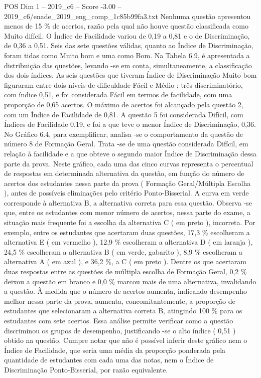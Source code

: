 \begin{textsample}{POS Dim 1 – 2019\_c6 – Score -3.00 – 2019\_c6/enade\_2019\_eng\_comp\_1c85b99fa3.txt}
Nenhuma questão apresentou menos de 15 \% de acertos, razão pela qual não houve questão classificada como Muito difícil.
O Índice de Facilidade variou de 0,19 a 0,81 e o de Discriminação, de 0,36 a 0,51.
Seis das sete questões válidas, quanto ao Índice de Discriminação, foram tidas como Muito bom e uma como Bom.
Na Tabela 6.9, é apresentada a distribuição das questões, levando -se em conta, simultaneamente, a classificação dos dois índices.
As seis questões que tiveram Índice de Discriminação Muito bom figuraram entre dois níveis de dificuldade Fácil e Médio : três discriminatório, com índice 0,51, e foi considerada Fácil em termos de facilidade, com uma proporção de 0,65 acertos.
O máximo de acertos foi alcançado pela questão 2, com um Índice de Facilidade de 0,81.
A questão 5 foi considerada Difícil, com Índices de Facilidade 0,19, e foi a que teve o menor Índice de Discriminação, 0,36.
No Gráfico 6.4, para exemplificar, analisa -se o comportamento da questão de número 8 de Formação Geral.
Trata -se de uma questão considerada Difícil, em relação à facilidade e a que obteve o segundo maior Índice de Discriminação dessa parte da prova.
Neste gráfico, cada uma das cinco curvas representa o percentual de respostas em determinada alternativa da questão, em função do número de acertos dos estudantes nessa parte da prova ( Formação Geral/Múltipla Escolha ), antes de possíveis eliminações pelo critério Ponto-Bisserial.
A curva em verde corresponde à alternativa B, a alternativa correta para essa questão.
Observa -se que, entre os estudantes com menor número de acertos, nessa parte do exame, a situação mais frequente foi a escolha da alternativa C ( em preto ), incorreta.
Por exemplo, entre os estudantes que acertaram duas questões, 17,3 \% escolheram a alternativa E ( em vermelho ), 12,9 \% escolheram a alternativa D ( em laranja ), 24,5 \% escolheram a alternativa B ( em verde, gabarito ), 8,9 \% escolheram a alternativa A ( em azul ), e 36,2 \%, a C ( em preto ).
Dentre os que acertaram duas respostas entre as questões de múltipla escolha de Formação Geral, 0,2 \% deixou a questão em branco e 0,0 \% marcou mais de uma alternativa, invalidando a questão.
À medida que o número de acertos aumenta, indicando desempenho melhor nessa parte da prova, aumenta, concomitantemente, a proporção de estudantes que selecionaram a alternativa correta B, atingindo 100 \% para os estudantes com sete acertos.
Essa análise permite verificar como a questão discriminou os grupos de desempenho, justificando -se o alto índice ( 0,51 ) obtido na questão.
Cumpre notar que não é possível inferir deste gráfico nem o Índice de Facilidade, que seria uma média da proporção ponderada pela quantidade de estudantes com cada uma das notas, nem o Índice de Discriminação Ponto-Bisserial, por razão equivalente.

\end{textsample}
